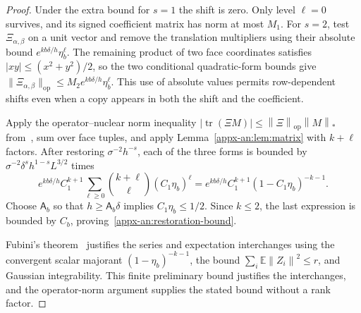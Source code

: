 \documentclass[11pt,letterpaper]{article}
\theoremstyle{remark}
\newcommand{\E}{\mathbb E}
\newcommand{\tr}{\operatorname{tr}}
\newcommand{\op}{\mathrm{op}}
\newcommand{\norm}[1]{\left\lVert#1\right\rVert}
\begin{document}
\begin{proof}
Under the extra bound for $s=1$ the shift is zero. Only level $\ell=0$ survives, and its signed coefficient matrix has norm at most $M_1$. For $s=2$, test $\Xi_{\alpha,\beta}$ on a unit vector and remove the translation multipliers using their absolute bound $e^{kb\delta/h}\eta_b^\ell$. The remaining product of two face coordinates satisfies $|xy|\le(x^2+y^2)/2$, so the two conditional quadratic-form bounds give $\|\Xi_{\alpha,\beta}\|_{\op}\le M_2 e^{kb\delta/h}\eta_b^\ell$. This use of absolute values permits row-dependent shifts even when a copy appears in both the shift and the coefficient.

Apply the operator--nuclear norm inequality
\(|\tr(\Xi M)|\le\norm\Xi_\op\norm M_*\)
from~\cite[Chapter~IV]{Bhatia1997}, sum over face
tuples, and apply Lemma~\ref{appx-an:lem:matrix} with \(k+\ell\) factors.
After restoring \(\sigma^{-2}h^{-s}\), each of the three forms
is bounded by \(\sigma^{-2}\delta^sh^{1-s}L^{3/2}\) times
\[
 e^{kb\delta/h}C_1^{k+1}
 \sum_{\ell\ge0}\binom{k+\ell}{\ell}(C_1\eta_b)^\ell
 =e^{kb\delta/h}C_1^{k+1}(1-C_1\eta_b)^{-k-1}.
\]
Choose \(\mathsf A_b\) so that \(h\ge\mathsf A_b\delta\) implies
\(C_1\eta_b\le1/2\). Since \(k\le2\), the last expression is
bounded by \(C_b\), proving~\eqref{appx-an:restoration-bound}.

Fubini's theorem~\cite[Section~2.5]{Folland1999} justifies the
series and expectation interchanges using the convergent scalar
majorant \((1-\eta_b)^{-k-1}\), the bound
\(\sum_i\E\norm{Z_i}^2\le r\), and Gaussian integrability.
This finite preliminary bound justifies the interchanges, and the
operator-norm argument supplies the stated bound without a rank factor.
\end{proof}
\end{document}
